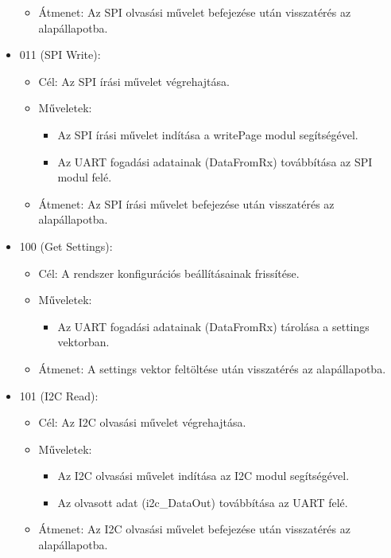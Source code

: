 \documentclass[a4paper,12pt,oneside]{book}
\begin{document}
\begin{itemize}
\begin{itemize}
        \item Átmenet: Az SPI olvasási művelet befejezése után visszatérés az alapállapotba.
    \end{itemize}
    \item 011 (SPI Write):
    \begin{itemize}
        \item Cél: Az SPI írási művelet végrehajtása.
        \item Műveletek:
        \begin{itemize}
            \item Az SPI írási művelet indítása a writePage modul segítségével.
            \item Az UART fogadási adatainak (DataFromRx) továbbítása az SPI modul felé.
        \end{itemize}
        \item Átmenet: Az SPI írási művelet befejezése után visszatérés az alapállapotba.
    \end{itemize}
    \item 100 (Get Settings):
    \begin{itemize}
        \item Cél: A rendszer konfigurációs beállításainak frissítése.
        \item Műveletek:
        \begin{itemize}
            \item Az UART fogadási adatainak (DataFromRx) tárolása a settings vektorban.
        \end{itemize}
        \item Átmenet: A settings vektor feltöltése után visszatérés az alapállapotba.
    \end{itemize}
    \item 101 (I2C Read):
    \begin{itemize}
        \item Cél: Az I2C olvasási művelet végrehajtása.
        \item Műveletek:
        \begin{itemize}
            \item Az I2C olvasási művelet indítása az I2C modul segítségével.
            \item Az olvasott adat (i2c\_DataOut) továbbítása az UART felé.
        \end{itemize}
        \item Átmenet: Az I2C olvasási művelet befejezése után visszatérés az alapállapotba.
    \end{itemize}

\end{itemize}
\end{document}
